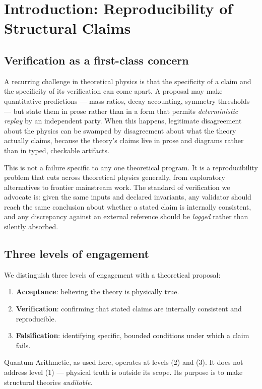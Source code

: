 \documentclass[12pt,a4paper]{article}
\begin{document}
\section{Introduction: Reproducibility of Structural Claims}

\subsection{Verification as a first-class concern}

A recurring challenge in theoretical physics is that the specificity of a
claim and the specificity of its verification can come apart. A proposal may
make quantitative predictions --- mass ratios, decay accounting, symmetry
thresholds --- but state them in prose rather than in a form that permits
\emph{deterministic replay} by an independent party. When this happens,
legitimate disagreement about the physics can be swamped by disagreement
about what the theory actually claims, because the theory's claims live in
prose and diagrams rather than in typed, checkable artifacts.

This is not a failure specific to any one theoretical program. It is a
reproducibility problem that cuts across theoretical physics generally,
from exploratory alternatives to frontier mainstream work. The standard of
verification we advocate is: given the same inputs and declared invariants,
any validator should reach the same conclusion about whether a stated claim
is internally consistent, and any discrepancy against an external reference
should be \emph{logged} rather than silently absorbed.

\subsection{Three levels of engagement}

We distinguish three levels of engagement with a theoretical proposal:
\begin{enumerate}[nosep]
  \item \textbf{Acceptance}: believing the theory is physically true.
  \item \textbf{Verification}: confirming that stated claims are internally
        consistent and reproducible.
  \item \textbf{Falsification}: identifying specific, bounded conditions
        under which a claim fails.
\end{enumerate}
Quantum Arithmetic, as used here, operates at levels (2) and (3). It does
not address level (1) --- physical truth is outside its scope. Its purpose
is to make structural theories \emph{auditable}.
\end{document}
